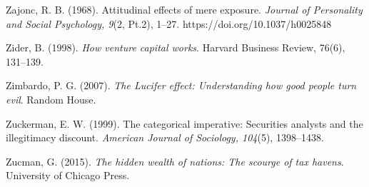 \begin{thebibliography}{}
    Zajonc, R. B. (1968). Attitudinal effects of mere exposure. \textit{Journal of Personality and Social Psychology, 9}(2, Pt.2), 1--27. https://doi.org/10.1037/h0025848

    Zider, B. (1998). \textit{How venture capital works}. Harvard Business Review, 76(6), 131–139.

    Zimbardo, P. G. (2007). \textit{The Lucifer effect: Understanding how good people turn evil}. Random House.

    Zuckerman, E. W. (1999). The categorical imperative: Securities analysts and the illegitimacy discount. \textit{American Journal of Sociology, 104}(5), 1398–1438.

    Zucman, G. (2015). \textit{The hidden wealth of nations: The scourge of tax havens}. University of Chicago Press.

    
    
    
    
   
    
    
    
    
    
    
    
    
    
    
     
    
     
    

    
    
    
    
        
    
    
    
    

    
    
    
    
    
        

    
    
    
    
     
    
    
    
    
    
        
    
    
    
    
    
    
    
    
    
     
    
    
     


\end{thebibliography}
